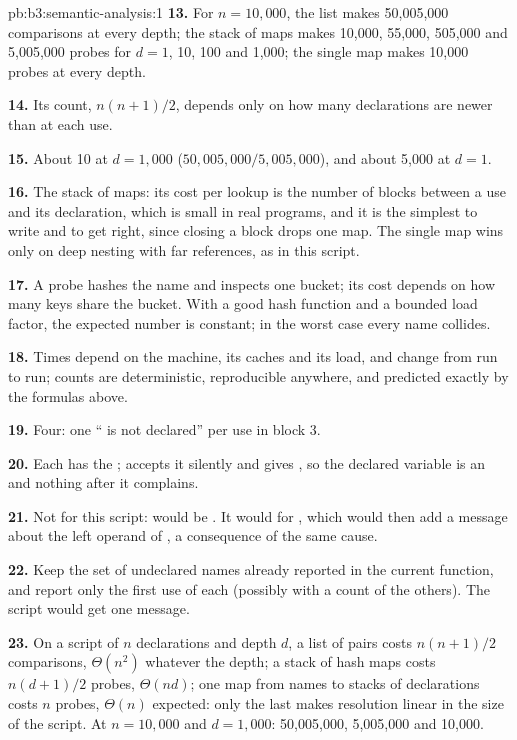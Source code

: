 \begin{solution}{pb:b3:semantic-analysis:1}
\textbf{13.} For $n = 10{,}000$, the list makes 50,005,000 comparisons at every depth; the stack of maps makes 10,000, 55,000, 505,000 and 5,005,000 probes for $d = 1$, 10, 100 and 1,000; the single map makes 10,000 probes at every depth.

\textbf{14.} Its count, $n(n+1)/2$, depends only on how many declarations are newer than  at each use.

\textbf{15.} About 10 at $d = 1{,}000$ ($50{,}005{,}000 / 5{,}005{,}000$), and about 5,000 at $d = 1$.

\textbf{16.} The stack of maps: its cost per lookup is the number of blocks between a use and its declaration, which is small in real programs, and it is the simplest to write and to get right, since closing a block drops one map. The single map wins only on deep nesting with far references, as in this script.

\textbf{17.} A probe hashes the name and inspects one bucket; its cost depends on how many keys share the bucket. With a good hash function and a bounded load factor, the expected number is constant; in the worst case every name collides.

\textbf{18.} Times depend on the machine, its caches and its load, and change from run to run; counts are deterministic, reproducible anywhere, and predicted exactly by the formulas above.

\textbf{19.} Four: one `` is not declared'' per use in block 3.

\textbf{20.} Each  has the ; \code{+} accepts it silently and gives , so the declared variable is an  and nothing after it complains.

\textbf{21.} Not for this script:  would be . It would for , which would then add a message about the left operand of \code{&&}, a consequence of the same cause.

\textbf{22.} Keep the set of undeclared names already reported in the current function, and report only the first use of each (possibly with a count of the others). The script would get one message.

\textbf{23.} On a script of $n$ declarations and depth $d$, a list of pairs costs $n(n+1)/2$ comparisons, $\Theta(n^2)$ whatever the depth; a stack of hash maps costs $n(d+1)/2$ probes, $\Theta(nd)$; one map from names to stacks of declarations costs $n$ probes, $\Theta(n)$ expected: only the last makes resolution linear in the size of the script. At $n = 10{,}000$ and $d = 1{,}000$: 50,005,000, 5,005,000 and 10,000.
\end{solution}
